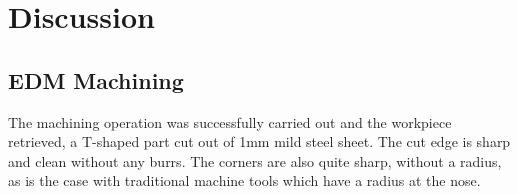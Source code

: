 \chapter{Discussion}
\section{EDM Machining}
The machining operation was successfully carried out and the workpiece retrieved, a T-shaped part cut out of 1mm mild steel sheet. The cut edge is sharp and clean without any burrs. The corners are also quite sharp, without a radius, as is the case with traditional machine tools which have a radius at the nose.